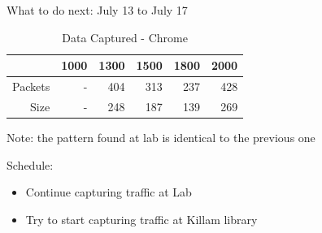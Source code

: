 \documentclass{beamer}
\begin{document}
\begin{frame}{What to do next: July 13 to July 17}
  \begin{table}[htbp]
    \centering
    \caption{Data Captured - Chrome}
    \begin{tabular}{rrrrrr}
      \toprule
              & 1000 & 1300 & 1500 & 1800 & 2000 \\
      \midrule
      Packets & -    & 404  & 313  & 237  & 428  \\
      Size    & -    & 248  & 187  & 139  & 269  \\
      \bottomrule
    \end{tabular}
  \end{table}

  Note: the pattern found at lab is identical to the previous one

  \vspace{20px}

  Schedule:
  \begin{itemize}
    \item Continue capturing traffic at Lab
    \item Try to start capturing traffic at Killam library
  \end{itemize}

\end{frame}
\end{document}
